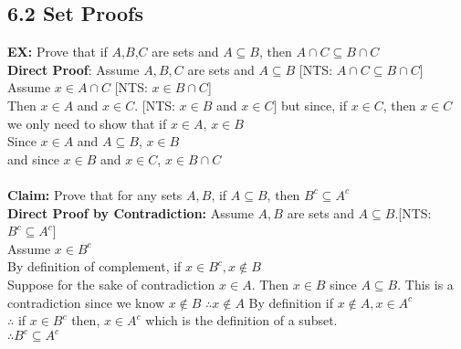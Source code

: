 \documentclass{article}
\begin{document}
		\subsection*{6.2 Set Proofs}
		\textbf{EX:} Prove that if $A$,$B$,$C$ are sets and $A\subseteq B$, then $A\cap C\subseteq B\cap C$\\
		\textbf{Direct Proof}: Assume $A,B,C$ are sets and $A\subseteq B$ [NTS: $A\cap C\subseteq B\cap C$]\\
		Assume $x\in A\cap C$ [NTS: $x\in B\cap C$]\\
		Then $x\in A$ and $x\in C$. [NTS: $x\in B$ and $x\in C$] but since, if $x\in C$, then $x\in C$ we only need to show that if $x\in A$, $x\in B$\\
		Since $x\in A$ and $A\subseteq B$, $x\in B$\\
		and since $x\in B$ and $x\in C$, $x\in B\cap C$\\
		\\
		\textbf{Claim:} Prove that for any sets $A,B$, if $A\subseteq B$, then $B^c\subseteq A^c$\\
		\textbf{Direct Proof by Contradiction:} Assume $A,B$ are sets and $A\subseteq B$.[NTS: $B^c\subseteq A^c$]\\
		Assume $x\in B^c$\\
		By definition of complement, if $x\in B^c, x\notin B$\\
		Suppose for the sake of contradiction $x\in A$. Then $x\in B$ since $A\subseteq B$. This is a contradiction since we know $x\notin B$ $\therefore x\notin A$
		By definition if $x\notin A, x\in A^c$\\
		$\therefore$ if $x\in B^c$ then, $x\in A^c$ which is the definition of a subset.\\
		$\therefore B^c\subseteq A^c$
\end{document}
